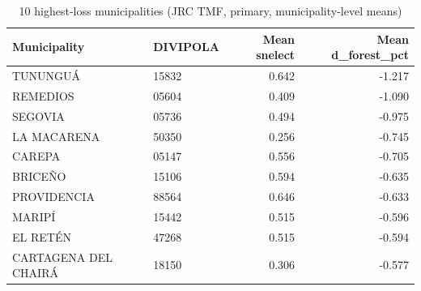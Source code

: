 \begin{table}

\caption{10 highest-loss municipalities (JRC TMF, primary, municipality-level means)}
\centering
\begin{tabular}[t]{llrr}
\toprule
Municipality & DIVIPOLA & Mean snelect & Mean d\_forest\_pct\\
\midrule
TUNUNGUÁ & 15832 & 0.642 & -1.217\\
REMEDIOS & 05604 & 0.409 & -1.090\\
SEGOVIA & 05736 & 0.494 & -0.975\\
LA MACARENA & 50350 & 0.256 & -0.745\\
CAREPA & 05147 & 0.556 & -0.705\\
\addlinespace
BRICEÑO & 15106 & 0.594 & -0.635\\
PROVIDENCIA & 88564 & 0.646 & -0.633\\
MARIPÍ & 15442 & 0.515 & -0.596\\
EL RETÉN & 47268 & 0.515 & -0.594\\
CARTAGENA DEL CHAIRÁ & 18150 & 0.306 & -0.577\\
\bottomrule
\end{tabular}
\end{table}
